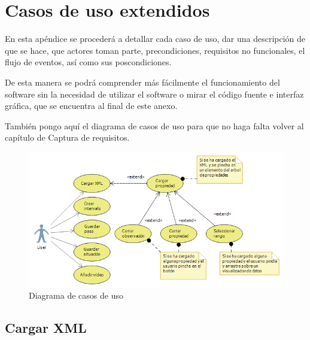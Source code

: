 \chapter{Casos de uso extendidos}
\label{chap:CasosDeUsoExt}
En esta ap\'endice se proceder\'a a detallar cada caso de uso, dar una descripci\'on
de que se hace, que actores toman parte, precondiciones, requisitos no funcionales, el flujo de
eventos, as\'i como sus poscondiciones.

De esta manera se podr\'a comprender m\'as f\'acilmente el funcionamiento del software
sin la necesidad de utilizar el software o mirar el c\'odigo fuente e interfaz gr\'afica,
que se encuentra al final de este anexo.

Tambi\'en pongo aqu\'i el diagrama de casos de uso para que no haga falta
volver al cap\'itulo de Captura de requisitos.

\begin{figure}[h]
	\centering
	\includegraphics[width=0.7\linewidth]{./Figures/useCaseDiagram.png}
	\caption[Diagrama de casos de uso]{Diagrama de casos de uso}
\end{figure}


\cleardoublepage

\section{Cargar XML}

